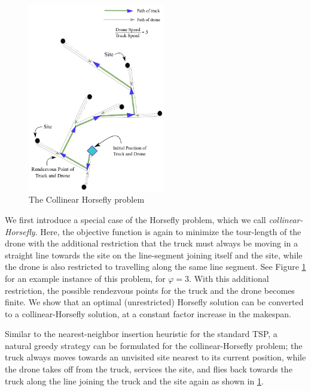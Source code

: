 \documentclass[conference]{IEEEtran}
\newcommand{\old}[1]{{}}
\begin{document}
\begin{figure}[h!]
\centering
\includegraphics[width=6cm]{img/collinear_horseflies.png}
\caption{ The Collinear Horsefly problem }
\label{fig:collinear-horsefly}
\end{figure}

We first introduce a special case of the Horsefly problem, which we call {\em collinear-Horsefly}.
Here, the objective function is again to minimize the tour-length of the drone with
the additional restriction that the truck must always be moving in a straight line towards
the site on the line-segment joining itself and the site, while the drone is also
restricted to travelling along the same line segment. 
See Figure \ref{fig:collinear-horsefly} for an example instance of this problem, for $\varphi=3$.
With this additional restriction, the possible rendezvous points for the truck and the drone becomes finite. 
We show that an optimal (unrestricted) Horsefly solution can be converted to a collinear-Horsefly solution,
at a constant factor increase in the makespan.

\old{We hope to prove that for any drone speed \(\varphi\) the optimal horsefly tour can always be distorted by a 
constant factor \(D\) which is hopefully independent of (or at least a slowly growing function of)
of \(\varphi\) and the length of $OPT$ into a tour having the above structure for the same ordering of sites.
}

Similar to the nearest-neighbor insertion heuristic for the standard
TSP, a natural greedy strategy can be formulated for the
collinear-Horsefly problem; the truck always moves towards an
unvisited site nearest to its current position, while the drone takes
off from the truck, services the site, and flies back towards the
truck along the line joining the truck and the site again as shown in
\ref{fig:collinear-horsefly}.
\end{document}
